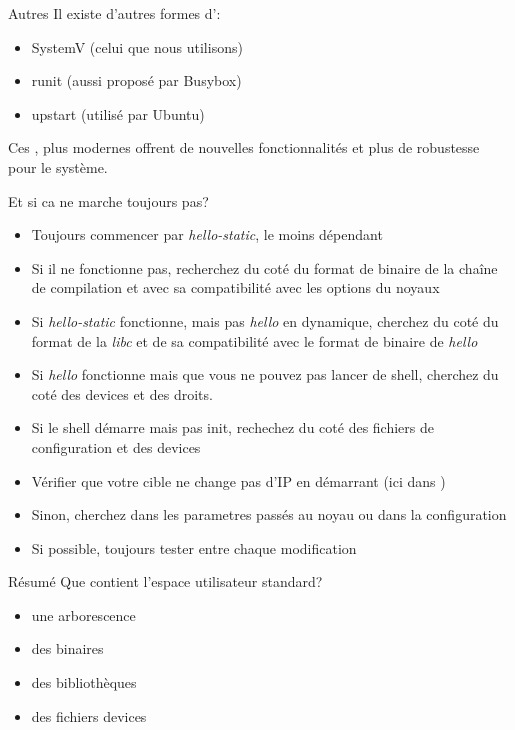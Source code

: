 \begin{frame}[fragile=singleslide]{Autres }
  Il existe d'autres formes d':
  \begin{itemize}
  \item SystemV (celui que nous utilisons)
  \item runit (aussi proposé par Busybox)
  \item upstart (utilisé par Ubuntu)
  \end{itemize}
  Ces ,  plus modernes  offrent de nouvelles  fonctionnalités et
  plus de robustesse pour le système.
\end{frame}

\begin{frame}{Et si ca ne marche toujours pas?}
  \begin{itemize}
  \item Toujours commencer par  \emph{hello-static}, le moins dépendant
  \item Si il ne fonctionne  pas, recherchez du coté du format de binaire
    de  la chaîne  de compilation  et avec  sa compatibilité  avec les
    options du noyaux
  \item  Si \emph{hello-static} fonctionne,  mais pas  \emph{hello} en
    dynamique, cherchez du coté du format de la \emph{libc} et de
    sa compatibilité avec le format de binaire de \emph{hello}
  \item Si \emph{hello} fonctionne mais  que vous ne pouvez pas lancer
    de shell, cherchez du coté des devices et des droits.
  \item Si le  shell démarre mais pas init, rechechez  du coté des
    fichiers de configuration et des devices
  \item Vérifier que votre cible  ne change pas d'IP en démarrant (ici
    dans )
  \item Sinon, cherchez dans les parametres passés au noyau ou dans la
    configuration
  \item Si possible, toujours tester entre chaque modification
  \end{itemize}
\end{frame}

\begin{frame}{Résumé}
  Que contient l'espace utilisateur standard?
  \begin{itemize}
  \item une arborescence
  \item des binaires
  \item des bibliothèques
  \item des fichiers devices
  \end{itemize}
\end{frame}

